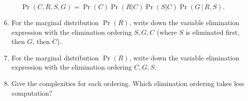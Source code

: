 \documentclass[submit]{harvardml}
\begin{document}
\begin{problem}
$$
\Pr(C, R,S,G) = \Pr(C)\Pr(R|C)\Pr(S|C)\Pr(G\, |\, R, S).
$$

\begin{enumerate}
    \setcounter{enumi}{5}
    \item For the marginal distribution $\Pr(R)$, write down the variable elimination expression with the elimination ordering $S, G, C$ (where $S$ is eliminated first, then $G$, then $C$).
    \item For the marginal distribution $\Pr(R)$, write down the variable elimination expression with the elimination ordering $C,G,S$.
    \item Give the complexities for each ordering. Which elimination ordering takes less computation?
\end{enumerate}
\end{problem}
\end{document}
